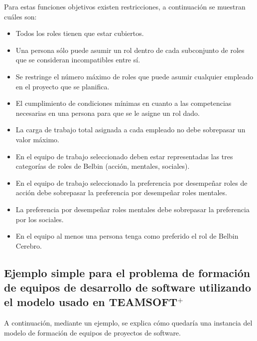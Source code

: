 Para estas funciones objetivos existen restricciones, a continuación se muestran cuáles son:
\begin{itemize}
	\item Todos los roles tienen que estar cubiertos.
	\item Una persona sólo puede asumir un rol dentro de cada subconjunto de roles que se consideran incompatibles entre sí.
	\item Se restringe el número máximo de roles que puede asumir cualquier empleado en el proyecto que se planifica.
	\item El cumplimiento de condiciones mínimas en cuanto a las competencias necesarias
	en una persona para que se le asigne un rol dado.
	\item La carga de trabajo total asignada a cada empleado no debe sobrepasar un valor
	máximo.
	\item En el equipo de trabajo seleccionado deben estar representadas las tres
	categorías de roles de Belbin (acción, mentales, sociales).
	\item En el equipo de trabajo seleccionado la preferencia por desempeñar roles de acción debe sobrepasar la preferencia por desempeñar roles mentales.
	\item La preferencia por desempeñar roles mentales debe	sobrepasar la preferencia por los sociales.
	\item En el equipo al menos una persona tenga como preferido el rol de Belbin Cerebro.
\end{itemize}

\subsection{Ejemplo simple para el problema de formación de equipos de desarrollo de software utilizando el modelo usado en TEAMSOFT$^+$} \label{ej-sof}

A continuación, mediante un ejemplo, se explica cómo quedaría una instancia del modelo de formación de equipos de proyectos de software.



